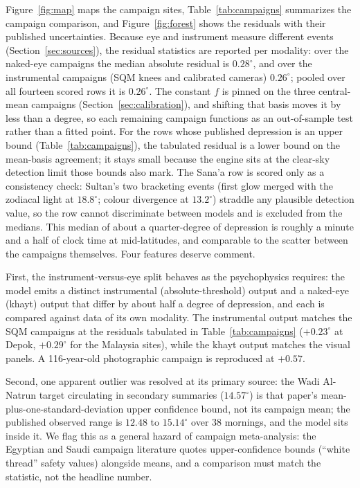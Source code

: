 \documentclass[preprint,12pt]{elsarticle}
\begin{document}
Figure~\ref{fig:map} maps the campaign sites,
Table~\ref{tab:campaigns} summarizes the campaign comparison, and
Figure~\ref{fig:forest} shows the residuals with their published
uncertainties. Because eye and instrument measure different events
(Section~\ref{sec:sources}), the residual statistics are reported per
modality: over the naked-eye campaigns the median absolute residual is
$0.28^{\circ}$, and over the instrumental campaigns (SQM knees and
calibrated cameras) $0.26^{\circ}$; pooled over all fourteen scored rows
it is $0.26^{\circ}$. The constant $f$ is pinned on the three
central-mean campaigns (Section~\ref{sec:calibration}), and shifting
that basis moves it by less than a degree, so each remaining campaign
functions as an out-of-sample test rather than a fitted point. For the
rows whose published depression is an upper bound
(Table~\ref{tab:campaigns}), the tabulated residual is a lower bound on
the mean-basis agreement; it stays small because the engine sits at the
clear-sky detection limit those bounds also mark. The Sana'a row is
scored only as a consistency check: Sultan's two bracketing events
(first glow merged with the zodiacal light at $18.8^{\circ}$; colour
divergence at $13.2^{\circ}$) straddle any plausible detection value,
so the row cannot discriminate between models and is excluded from the medians. This
median of about a quarter-degree of depression is
roughly a minute and a half of clock time at
mid-latitudes, and comparable to the scatter between the campaigns
themselves. Four features deserve comment.

First, the instrument-versus-eye split behaves as the psychophysics
requires: the model emits a distinct instrumental (absolute-threshold)
output and a naked-eye (khayt) output that differ by about half a degree
of depression, and each is compared against data of its own modality. The
instrumental output matches the SQM campaigns at the residuals tabulated
in Table~\ref{tab:campaigns} ($+0.23^{\circ}$ at Depok, $+0.29^{\circ}$
for the Malaysia sites), while the khayt output matches the visual
panels. A 116-year-old photographic campaign \citep{miethe1909} is
reproduced at $+0.57$.

Second, one apparent outlier was resolved at its primary source: the
Wadi Al-Natrun target circulating in secondary summaries ($14.57^{\circ}$)
is that paper's mean-plus-one-standard-deviation upper confidence
bound, not its campaign mean; the published observed range is
$12.48$ to $15.14^{\circ}$ over 38 mornings, and the model sits inside
it. We flag this as a general hazard of campaign meta-analysis: the
Egyptian and Saudi campaign literature quotes upper-confidence bounds
(``white thread'' safety values) alongside means, and a comparison must
match the statistic, not the headline number.
\end{document}
